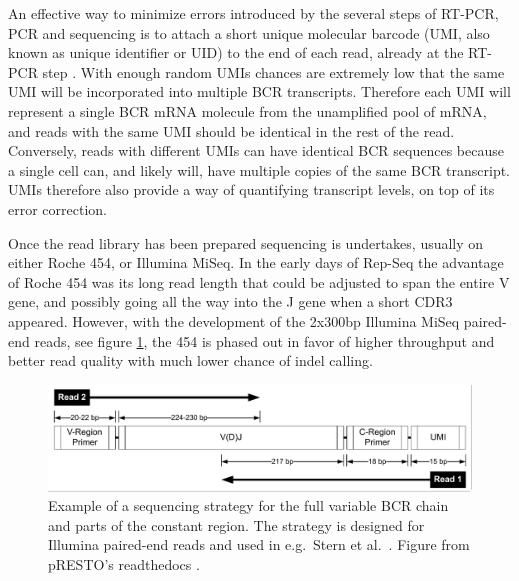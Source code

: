 An effective way to minimize errors introduced by the several steps of RT-PCR, PCR and sequencing is to attach a short unique molecular barcode (UMI, also known as unique identifier or UID) to the end of each read, already at the RT-PCR step \cite{turchaninova2016high}.
With enough random UMIs chances are extremely low that the same UMI will be incorporated into multiple BCR transcripts.
Therefore each UMI will represent a single BCR mRNA molecule from the unamplified pool of mRNA, and reads with the same UMI should be identical in the rest of the read.
Conversely, reads with different UMIs can have identical BCR sequences because a single cell can, and likely will, have multiple copies of the same BCR transcript.
UMIs therefore also provide a way of quantifying transcript levels, on top of its error correction.

Once the read library has been prepared sequencing is undertakes, usually on either Roche 454, or Illumina MiSeq.
In the early days of Rep-Seq the advantage of Roche 454 was its long read length that could be adjusted to span the entire V gene, and possibly going all the way into the J gene when a short CDR3 appeared.
However, with the development of the 2x300bp Illumina MiSeq paired-end reads, see figure \ref{fig:UMIread}, the 454 is phased out in favor of higher throughput and better read quality with much lower chance of indel calling.

\begin{figure}
    \centering
    \includegraphics[width=1\textwidth]{figures/Stern2014_ReadConfiguration.pdf}
    \caption{
        \label{fig:UMIread}
        Example of a sequencing strategy for the full variable BCR chain and parts of the constant region. The strategy is designed for Illumina paired-end reads and used in e.g.\  Stern et al.\ \cite{stern2014b}. Figure from pRESTO's readthedocs \cite{vander2014presto}.
    }
\end{figure}

